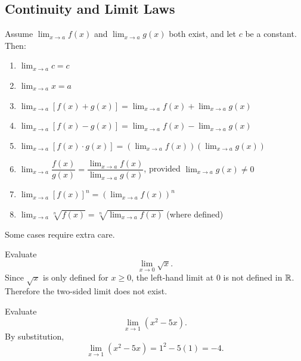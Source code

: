 \subsection{Continuity and Limit Laws}

\begin{definition}
Assume $\lim_{x\to a}f(x)$ and $\lim_{x\to a}g(x)$ both exist, and let $c$ be a constant. Then:
\begin{enumerate}
  \item $\lim_{x\to a}c = c$
  \item $\lim_{x\to a}x = a$
  \item $\lim_{x\to a}[f(x)+g(x)] = \lim_{x\to a}f(x)+\lim_{x\to a}g(x)$
  \item $\lim_{x\to a}[f(x)-g(x)] = \lim_{x\to a}f(x)-\lim_{x\to a}g(x)$
  \item $\lim_{x\to a}[f(x)\cdot g(x)] = \left(\lim_{x\to a}f(x)\right)\left(\lim_{x\to a}g(x)\right)$
  \item $\lim_{x\to a}\dfrac{f(x)}{g(x)} = \dfrac{\lim_{x\to a}f(x)}{\lim_{x\to a}g(x)}$, provided $\lim_{x\to a}g(x)\ne 0$
  \item $\lim_{x\to a}[f(x)]^n = \left(\lim_{x\to a}f(x)\right)^n$
  \item $\lim_{x\to a}\sqrt[n]{f(x)} = \sqrt[n]{\lim_{x\to a}f(x)}$ (where defined)
\end{enumerate}
\end{definition}

Some cases require extra care.

\begin{example}
Evaluate
\[
  \lim_{x\to 0}\sqrt{x}.
\]
Since $\sqrt{x}$ is only defined for $x\ge 0$, the left-hand limit at $0$ is not defined in $\mathbb{R}$. Therefore the two-sided limit does not exist.
\end{example}

\begin{example}
Evaluate
\[
  \lim_{x\to 1}(x^2-5x).
\]
By substitution,
\[
  \lim_{x\to 1}(x^2-5x)=1^2-5(1)=-4.
\]
\end{example}
